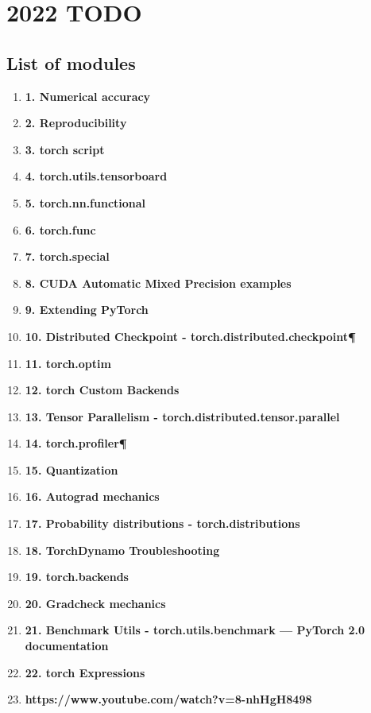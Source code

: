 \documentclass{paper}
\begin{document}

\section{2022 TODO}
\subsection{List of modules}
\begin{enumerate}
\item \textbf{1. Numerical accuracy}
\item \textbf{2. Reproducibility}
\item \textbf{3. torch script}
\item \textbf{4. torch.utils.tensorboard}
\item \textbf{5. torch.nn.functional}
\item \textbf{6. torch.func }
\item \textbf{7. torch.special}
\item \textbf{8. CUDA Automatic Mixed Precision examples}
\item \textbf{9. Extending PyTorch}
\item \textbf{10. Distributed Checkpoint - torch.distributed.checkpoint¶}
\item \textbf{11. torch.optim}
\item \textbf{12. torch Custom Backends}
\item \textbf{13. Tensor Parallelism - torch.distributed.tensor.parallel}
\item \textbf{14. torch.profiler¶}
\item \textbf{15. Quantization}
\item \textbf{16. Autograd mechanics}
\item \textbf{17. Probability distributions - torch.distributions}
\item \textbf{18. TorchDynamo Troubleshooting}
\item \textbf{19. torch.backends}
\item \textbf{20. Gradcheck mechanics }
\item \textbf{21. Benchmark Utils - torch.utils.benchmark — PyTorch 2.0 documentation}
\item \textbf{22. torch Expressions}
\item \textbf{https://www.youtube.com/watch?v=8-nhHgH8498}
\end{enumerate}
\end{document}

